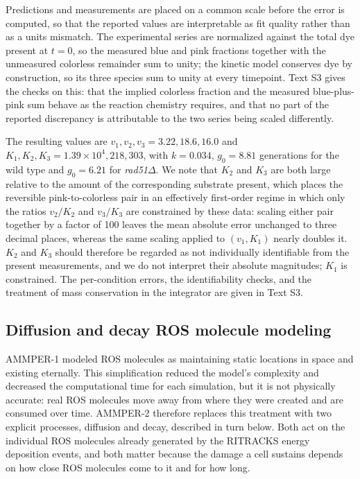 \documentclass{asmarticle}
\begin{document}
Predictions and measurements are placed on a common scale before the error is computed, so that the reported values are interpretable as fit quality rather than as a units mismatch. The experimental series are normalized against the total dye present at $t = 0$, so the measured blue and pink fractions together with the unmeasured colorless remainder sum to unity; the kinetic model conserves dye by construction, so its three species sum to unity at every timepoint. Text S3 gives the checks on this: that the implied colorless fraction and the measured blue-plus-pink sum behave as the reaction chemistry requires, and that no part of the reported discrepancy is attributable to the two series being scaled differently.

The resulting values are $v_1, v_2, v_3 = 3.22, 18.6, 16.0$ and $K_1, K_2, K_3 = 1.39 \times 10^4, 218, 303$, with $k = 0.034$, $g_0 = 8.81$ generations for the wild type and $g_0 = 6.21$ for \textit{rad51}$\Delta$. We note that $K_2$ and $K_3$ are both large relative to the amount of the corresponding substrate present, which places the reversible pink-to-colorless pair in an effectively first-order regime in which only the ratios $v_2/K_2$ and $v_3/K_3$ are constrained by these data: scaling either pair together by a factor of 100 leaves the mean absolute error unchanged to three decimal places, whereas the same scaling applied to $(v_1, K_1)$ nearly doubles it. $K_2$ and $K_3$ should therefore be regarded as not individually identifiable from the present measurements, and we do not interpret their absolute magnitudes; $K_1$ is constrained. The per-condition errors, the identifiability checks, and the treatment of mass conservation in the integrator are given in Text S3.

\subsection{Diffusion and decay ROS molecule modeling}
AMMPER-1 modeled ROS molecules as maintaining static locations in space and existing eternally. This simplification reduced the model's complexity and decreased the computational time for each simulation, but it is not physically accurate: real ROS molecules move away from where they were created and are consumed over time. AMMPER-2 therefore replaces this treatment with two explicit processes, diffusion and decay, described in turn below. Both act on the individual ROS molecules already generated by the RITRACKS energy deposition events, and both matter because the damage a cell sustains depends on how close ROS molecules come to it and for how long.
\end{document}
